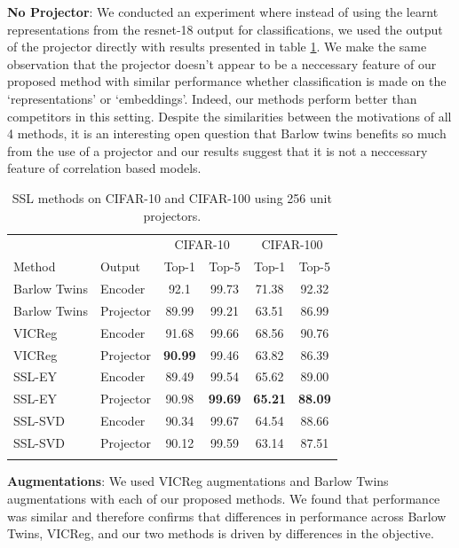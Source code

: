 \textbf{No Projector}: We conducted an experiment where instead of using the learnt representations from the resnet-18 output for classifications, we used the output of the projector directly with results presented in table \ref{tab:selfsupsmaller}. We make the same observation that the projector doesn't appear to be a neccessary feature of our proposed method with similar performance whether classification is made on the `representations' or `embeddings'. Indeed, our methods perform better than competitors in this setting. Despite the similarities between the motivations of all 4 methods, it is an interesting open question that Barlow twins benefits so much from the use of a projector and our results suggest that it is not a neccessary feature of correlation based models.

\begin{table}[h!] 
\setlength{\tabcolsep}{6pt} %
\renewcommand{\arraystretch}{1.1} %
\centering 
\begin{tabular}{llcccc} 
\toprule
&& \multicolumn{2}{c}{CIFAR-10} & \multicolumn{2}{c}{CIFAR-100} \\ 
\cmidrule(lr){3-4} \cmidrule(lr){5-6}
Method & Output & Top-1 & Top-5 & Top-1 & Top-5 \\ 
\midrule
Barlow Twins & Encoder & 92.1 & 99.73 & 71.38 & 92.32\\
Barlow Twins & Projector & 89.99&99.21 & 63.51&86.99\\
\midrule
VICReg & Encoder & 91.68	&99.66 & 68.56&	90.76\\
VICReg & Projector & \textbf{90.99}&99.46 & 63.82&86.39\\
\midrule
SSL-EY & Encoder & 89.49 & 99.54 & 65.62& 89.00\\
SSL-EY & Projector & 90.98 &\textbf{99.69} & \textbf{65.21}&\textbf{88.09}\\
\midrule
SSL-SVD & Encoder & 90.34 & 99.67 & 64.54 & 88.66 \\
SSL-SVD & Projector & 90.12& 99.59 & 63.14& 87.51
 \\
\bottomrule
\addlinespace
\end{tabular}
\caption{SSL methods on CIFAR-10 and CIFAR-100 using 256 unit projectors.} 
\label{tab:selfsupsmaller} 
\end{table}

\textbf{Augmentations}: We used VICReg augmentations and Barlow Twins augmentations with each of our proposed methods. We found that performance was similar and therefore confirms that differences in performance across Barlow Twins, VICReg, and our two methods is driven by differences in the objective.


